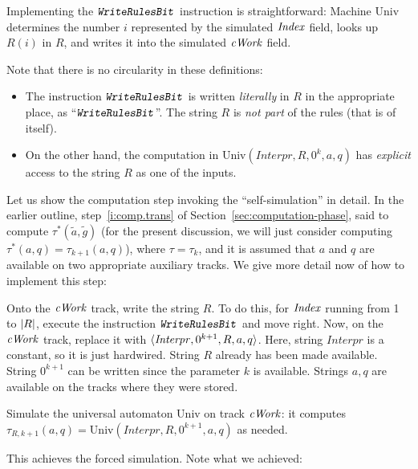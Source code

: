 \documentclass[12pt]{memoir}
\newcommand{\fld}[1]{\ensuremath{\textit{#1\/}}}
\newcommand{\rul}[1]{\ensuremath{\texttt{\slshape #1\/}}}
\newcommand{\Index}{\fld{Index}}
\newcommand{\cWork}{\fld{cWork}}
\newcommand{\Interpr}{\mathit{Interpr}}
\newcommand{\Un}{\mathrm{Univ}}
\newcommand{\WriteRulesBit}{\rul{WriteRulesBit}}
\begin{document}
Implementing the \( \WriteRulesBit \) instruction is straightforward:
Machine \( \Un \) determines the number \( i \)
represented by the simulated \( \Index \) field, 
looks up \( R(i) \) in \( R \), and writes it into the simulated \( \cWork \) field.

Note that there is no circularity in these definitions:
  \begin{itemize}
  \item 
The instruction \( \WriteRulesBit \) is written \emph{literally}
in \( R \) in the appropriate place, as ``\(\WriteRulesBit \)''.
The string \( R \) is \emph{not part} of the rules (that is of itself).  
  \item On the other hand, the computation in
\( \Un(\Interpr,R,0^{k},a, q) \) 
has \emph{explicit} access to the string \( R \) as one of the inputs.
  \end{itemize}

Let us show the computation step invoking the ``self-simulation'' in detail.
In the earlier outline, step~\ref{i:comp.trans} of Section~\ref{sec:computation-phase},
said to compute \( \tau^{*}(\tilde a, \tilde g) \)
(for the present discussion, we will just consider computing 
\( \tau^{*}(a,q)=\tau_{k+1}(a,q) \)), where \( \tau=\tau_{k} \),
and it is assumed that \( a \) and \( q \) are available on two appropriate
auxiliary tracks.
We give more detail now of how to implement this step:

\begin{enumerate}
\item Onto the \( \cWork \) track, write the string \( R \).
To do this, for \( \Index \) running from 1 to \( \lvert R \rvert \), 
execute the instruction \( \WriteRulesBit \) and move right.
Now, on the \( \cWork  \) track, replace it with \( \ang{\Interpr,0^{k+1},R,a,q} \).
Here, string \( \Interpr \) is a constant, so it is just hardwired.
String \( R \) already has been made available.
String \( 0^{k+1} \) can be written since the parameter \( k \) is available.
Strings \( a,q \) are available on the tracks where they were stored.
\begin{sloppypar}
 \item Simulate the universal automaton \( \Un \) on track \( \cWork \):
   it computes \( \tau_{R,k+1}(a,q)=\Un(\Interpr,R,0^{k+1}, a,q) \)
as needed.  
\end{sloppypar}
\end{enumerate}

This achieves the forced simulation.
Note what we achieved:
\end{document}
